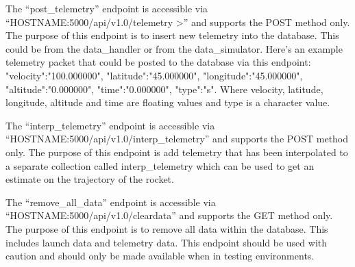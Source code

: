 \documentclass[onecolumn, draftclsnofoot,10pt, compsoc]{IEEEtran}
\begin{document}
The “post\_telemetry” endpoint is accessible via “HOSTNAME:5000/api/v1.0/telemetry >” and supports the POST method only. The purpose of this endpoint is to insert new telemetry into the database. This could be from the data\_handler or from the data\_simulator. Here’s an example telemetry packet that could be posted to the database via this endpoint:
{"velocity":"100.000000", "latitude":"45.000000", "longitude":"45.000000", "altitude":"0.000000", "time":"0.000000", "type":"s"}. Where velocity, latitude, longitude, altitude and time are floating values and type is a character value. \par


The “interp\_telemetry” endpoint is accessible via “HOSTNAME:5000/api/v1.0/interp\_telemetry” and supports the POST method only. The purpose of this endpoint is add telemetry that has been interpolated to a separate collection called interp\_telemetry which can be used to get an estimate on the trajectory of the rocket. \par


The “remove\_all\_data” endpoint is accessible via “HOSTNAME:5000/api/v1.0/cleardata” and supports the GET method only. The purpose of this endpoint is to remove all data within the database. This includes launch data and telemetry data. This endpoint should be used with caution and should only be made available when in testing environments. \par
\end{document}
